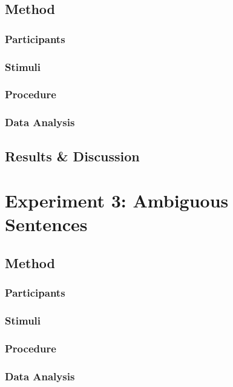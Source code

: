 \documentclass[10pt,letterpaper]{article}
\begin{document}
\subsection{Method}

\subsubsection{Participants} \quad

\subsubsection{Stimuli} \quad

\subsubsection{Procedure} \quad

\subsubsection{Data Analysis} \quad

\subsection{Results \& Discussion}

\section{Experiment 3: Ambiguous Sentences}

\subsection{Method} 

\subsubsection{Participants} \quad

\subsubsection{Stimuli} \quad

\subsubsection{Procedure} \quad

\subsubsection{Data Analysis} \quad
\end{document}
